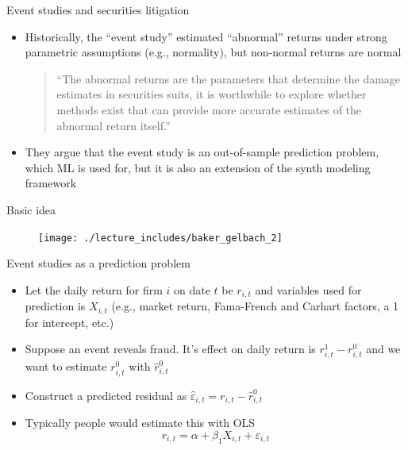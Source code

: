 \documentclass{beamer}
\begin{document}
\begin{frame}{Event studies and securities litigation}

\begin{itemize}

\item Historically, the ``event study'' estimated ``abnormal'' returns under strong parametric assumptions (e.g., normality), but non-normal returns are normal

\begin{quote}
``The abnormal returns are the parameters that determine the damage estimates in securities suits, it is worthwhile to explore whether methods exist that can provide more accurate estimates of the abnormal return itself.''
\end{quote}

\item They argue that the event study is an out-of-sample prediction problem, which ML is used for, but it is also an extension of the synth modeling framework

\end{itemize}

\end{frame}

\begin{frame}{Basic idea}

\begin{figure}
\texttt{[image: ./lecture\_includes/baker\_gelbach\_2]}
\end{figure}
\end{frame}


\begin{frame}{Event studies as a prediction problem}

\begin{itemize}
\item Let the daily return for firm $i$ on date $t$ be $r_{i,t}$ and variables used for prediction is $X_{i,t}$ (e.g., market return, Fama-French and Carhart factors, a 1 for intercept, etc.)
\item Suppose an event reveals fraud.  It's effect on daily return is $r^1_{i,t} - r^0_{i,t}$ and we want to estimate $r^0_{i,t}$ with $\widehat{r}^0_{i,t}$
\item Construct a predicted residual as $\widehat{\varepsilon}_{i,t} = r_{i,t} - \widehat{r}^0_{i,t}$
\item Typically people would estimate this with OLS $$r_{i,t} = \alpha + \beta_1 X_{i,t} + \varepsilon_{i,t}$$
\end{itemize}

\end{frame}
\end{document}
